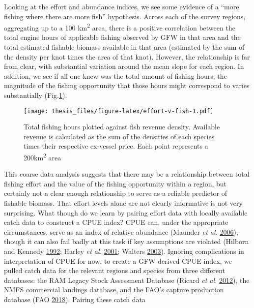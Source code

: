 \documentclass[twoside,12pt,final]{ucthesis-CA2012}
\begin{document}
\begin{ucmainmatter}
Looking at the effort and abundance indices, we see some evidence of a
``more fishing where there are more fish'' hypothesis. Across each of
the survey regions, aggregating up to a 100 km\textsuperscript{2} area,
there is a positive correlation between the total engine hours of
applicable fishing observed by GFW in that area and the total estimated
fishable biomass available in that area (estimated by the sum of the
density per knot times the area of that knot). However, the relationship
is far from clear, with substantial variation around the mean slope for
each region. In addition, we see if all one knew was the total amount of
fishing hours, the magnitude of the fishing opportunity that those hours
might correspond to varies substantially (Fig.\ref{fig:effort-v-fish}).
\begin{figure}
\centering
\texttt{[image: thesis\_files/figure-latex/effort-v-fish-1.pdf]}
\caption{\label{fig:effort-v-fish}Total fishing hours plotted against fish
revenue density. Available revenue is calculated as the sum of the
densities of each species times their respective ex-vessel price. Each
point represents a 200km\textsuperscript{2} area}
\end{figure}
This coarse data analysis suggests that there may be a relationship
between total fishing effort and the value of the fishing opportunity
within a region, but certainly not a clear enough relationship to serve
as a reliable predictor of fishable biomass. That effort levels alone
are not clearly informative is not very surprising. What though do we
learn by pairing effort data with locally available catch data to
construct a CPUE index? CPUE can, under the appropriate circumstances,
serve as an index of relative abundance (Maunder \emph{et al.}
\protect\hyperlink{ref-Maunder2006}{2006}), though it can also fail
badly at this task if key assumptions are violated (Hilborn and Kennedy
\protect\hyperlink{ref-Hilborn1992a}{1992}; Harley \emph{et al.}
\protect\hyperlink{ref-Harley2001}{2001}; Walters
\protect\hyperlink{ref-Walters2003}{2003}). Ignoring complications in
interpretation of CPUE for now, to create a GFW derived CPUE index, we
pulled catch data for the relevant regions and species from three
different databases: the RAM Legacy Stock Assessment Database (Ricard
\emph{et al.} \protect\hyperlink{ref-Ricard2012}{2012}), the
\href{https://www.st.nmfs.noaa.gov/commercial-fisheries/commercial-landings/annual-landings/index}{NMFS
commercial landings database}, and the FAO's capture production database
(FAO \protect\hyperlink{ref-FAO2018}{2018}). Pairing these catch data

\end{ucmainmatter}
\end{document}
